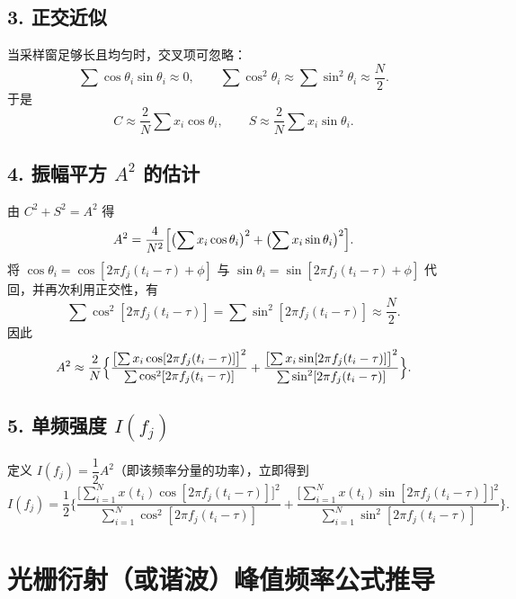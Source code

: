 \documentclass[withoutpreface,bwprint]{cumcmthesis}
\begin{document}
\subsection*{3. 正交近似}
当采样窗足够长且均匀时，交叉项可忽略：
%
\begin{equation}
\sum\cos\theta_i\sin\theta_i\approx 0,\qquad
\sum\cos^2\theta_i\approx\sum\sin^2\theta_i
\approx\frac{N}{2}.
\end{equation}
%
于是
%
\begin{equation}
C\approx\frac{2}{N}\sum x_i\cos\theta_i,\qquad
S\approx\frac{2}{N}\sum x_i\sin\theta_i.
\end{equation}

\subsection*{4. 振幅平方 $A^2$ 的估计}
由 $C^2+S^2=A^2$ 得
%
\begin{equation}
A^2=\frac{4}{N^2}\Bigl[
\bigl(\sum x_i\cos\theta_i\bigr)^2
+\bigl(\sum x_i\sin\theta_i\bigr)^2
\Bigr].
\end{equation}
%
将 $\cos\theta_i=\cos[2\pi f_j(t_i-\tau)+\phi]$ 与
$\sin\theta_i=\sin[2\pi f_j(t_i-\tau)+\phi]$ 代回，并再次利用正交性，有
%
\begin{equation}
\sum\cos^2[2\pi f_j(t_i-\tau)]
=\sum\sin^2[2\pi f_j(t_i-\tau)]
\approx\frac{N}{2}.
\end{equation}
%
因此
%
\begin{equation}
A^2\approx
\frac{2}{N}\Bigl\{
\frac{\bigl[\sum x_i\cos[2\pi f_j(t_i-\tau)]\bigr]^2}
{\sum\cos^2[2\pi f_j(t_i-\tau)]}
+
\frac{\bigl[\sum x_i\sin[2\pi f_j(t_i-\tau)]\bigr]^2}
{\sum\sin^2[2\pi f_j(t_i-\tau)]}
\Bigr\}.
\end{equation}

\subsection*{5. 单频强度 $I(f_j)$}
定义 $I(f_j)=\dfrac12 A^2$（即该频率分量的功率），立即得到
%
\begin{equation}
\boxed{I(f_j)=
\frac12\biggl\{
\frac{\bigl[\sum_{i=1}^{N}x(t_i)\cos[2\pi f_j(t_i-\tau)]\bigr]^2}
{\sum_{i=1}^{N}\cos^2[2\pi f_j(t_i-\tau)]}
+
\frac{\bigl[\sum_{i=1}^{N}x(t_i)\sin[2\pi f_j(t_i-\tau)]\bigr]^2}
{\sum_{i=1}^{N}\sin^2[2\pi f_j(t_i-\tau)]}
\biggr\}}.
\end{equation}
\section*{光栅衍射（或谐波）峰值频率公式推导}
\end{document}
